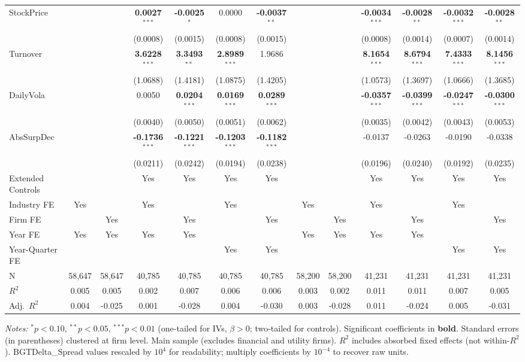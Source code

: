 \documentclass[11pt,a4paper]{article}
\begin{document}
\begin{table}[htbp]
\begin{tabular}{lcccccccccccc}
StockPrice &  &  & \textbf{0.0027}$^{***}$ & \textbf{-0.0025}$^{*}$ & 0.0000 & \textbf{-0.0037}$^{**}$ &  &  & \textbf{-0.0034}$^{***}$ & \textbf{-0.0028}$^{**}$ & \textbf{-0.0032}$^{***}$ & \textbf{-0.0028}$^{**}$ \\
 &  &  & (0.0008) & (0.0015) & (0.0008) & (0.0015) &  &  & (0.0008) & (0.0014) & (0.0007) & (0.0014) \\
Turnover &  &  & \textbf{3.6228}$^{***}$ & \textbf{3.3493}$^{**}$ & \textbf{2.8989}$^{***}$ & 1.9686 &  &  & \textbf{8.1654}$^{***}$ & \textbf{8.6794}$^{***}$ & \textbf{7.4333}$^{***}$ & \textbf{8.1456}$^{***}$ \\
 &  &  & (1.0688) & (1.4181) & (1.0875) & (1.4205) &  &  & (1.0573) & (1.3697) & (1.0666) & (1.3685) \\
DailyVola &  &  & 0.0050 & \textbf{0.0204}$^{***}$ & \textbf{0.0169}$^{***}$ & \textbf{0.0289}$^{***}$ &  &  & \textbf{-0.0357}$^{***}$ & \textbf{-0.0399}$^{***}$ & \textbf{-0.0247}$^{***}$ & \textbf{-0.0300}$^{***}$ \\
 &  &  & (0.0040) & (0.0050) & (0.0051) & (0.0062) &  &  & (0.0035) & (0.0042) & (0.0043) & (0.0053) \\
AbsSurpDec &  &  & \textbf{-0.1736}$^{***}$ & \textbf{-0.1221}$^{***}$ & \textbf{-0.1203}$^{***}$ & \textbf{-0.1182}$^{***}$ &  &  & -0.0137 & -0.0263 & -0.0190 & -0.0338 \\
 &  &  & (0.0211) & (0.0242) & (0.0194) & (0.0238) &  &  & (0.0196) & (0.0240) & (0.0192) & (0.0235) \\
\midrule
Extended Controls &  &  & Yes & Yes & Yes & Yes &  &  & Yes & Yes & Yes & Yes \\
Industry FE & Yes &  & Yes &  & Yes &  & Yes &  & Yes &  & Yes &  \\
Firm FE &  & Yes &  & Yes &  & Yes &  & Yes &  & Yes &  & Yes \\
Year FE & Yes & Yes & Yes & Yes &  &  & Yes & Yes & Yes & Yes &  &  \\
Year-Quarter FE &  &  &  &  & Yes & Yes &  &  &  &  & Yes & Yes \\
\midrule
N & 58,647 & 58,647 & 40,785 & 40,785 & 40,785 & 40,785 & 58,200 & 58,200 & 41,231 & 41,231 & 41,231 & 41,231 \\
$R^2$ & 0.005 & 0.005 & 0.002 & 0.007 & 0.006 & 0.006 & 0.003 & 0.002 & 0.011 & 0.011 & 0.007 & 0.005 \\
Adj.~$R^2$ & 0.004 & -0.025 & 0.001 & -0.028 & 0.004 & -0.030 & 0.003 & -0.028 & 0.011 & -0.024 & 0.005 & -0.031 \\
\bottomrule
\end{tabular}
\begin{minipage}{\linewidth}
\vspace{2pt}\scriptsize
\textit{Notes:} $^{*}p<0.10$, $^{**}p<0.05$, $^{***}p<0.01$ (one-tailed for IVs, $\beta > 0$; two-tailed for controls).
 Significant coefficients in \textbf{bold}.
 Standard errors (in parentheses) clustered at firm level.
 Main sample (excludes financial and utility firms).
 $R^2$ includes absorbed fixed effects (not within-$R^2$).
 BGTDelta\_Spread values rescaled by $10^4$ for readability; multiply coefficients by $10^{-4}$ to recover raw units.
\end{minipage}
\end{table}
\end{document}
